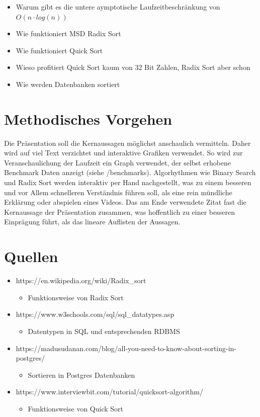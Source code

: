 \documentclass[a4paper, 12pt, oneside]{article}
\begin{document}
    \begin{itemize}
        \item Warum gibt es die untere aymptotische Laufzeitbeschränkung von $O(n \cdot log(n))$
        \item Wie funktioniert MSD Radix Sort 
        \item Wie funktioniert Quick Sort
        \item Wieso profitiert Quick Sort kaum von 32 Bit Zahlen, Radix Sort aber schon
        \item Wie werden Datenbanken sortiert
    \end{itemize}


    \section{Methodisches Vorgehen}

    Die Präsentation soll die Kernaussagen möglichst anschaulich vermitteln. 
    Daher wird auf viel Text verzichtet und interaktive Grafiken verwendet.
    So wird zur Veranschaulichung der Laufzeit ein Graph verwendet, der selbst 
    erhobene Benchmark Daten anzeigt (siehe /benchmarks). 
    Algorhythmen wie Binary Search und Radix Sort werden interaktiv per Hand 
    nachgestellt, was zu einem besseren und vor Allem schnelleren Verständnis
    führen soll, als eine rein mündliche Erklärung oder abspielen eines Videos. 
    Das am Ende verwendete Zitat fast die Kernaussage der Präsentation zusammen, was 
    hoffentlich zu einer besseren Einprägung führt, als das lineare 
    Auflisten der Aussagen.


    \clearpage
    \section{Quellen}

    \begin{itemize}
        \item https://en.wikipedia.org/wiki/Radix\_sort
        \begin{itemize}
            \item Funktionsweise von Radix Sort
        \end{itemize}
        \item https://www.w3schools.com/sql/sql\_datatypes.asp
        \begin{itemize}
            \item Datentypen in SQL und entsprechenden RDBMS
        \end{itemize}
        \item https://madusudanan.com/blog/all-you-need-to-know-about-sorting-in-postgres/
        \begin{itemize}
            \item Sortieren in Postgres Datenbanken 
        \end{itemize}
        \item https://www.interviewbit.com/tutorial/quicksort-algorithm/
        \begin{itemize}
            \item Funktionsweise von Quick Sort
        \end{itemize}
    \end{itemize}
\end{document}
